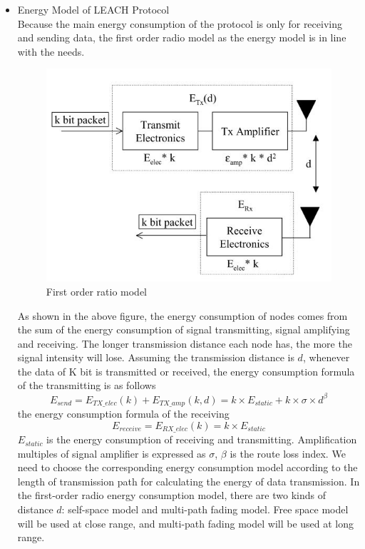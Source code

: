 \documentclass[11pt]{report}
\begin{document}
	\begin{itemize}
		\item Energy Model of LEACH Protocol\\
		
		Because the main energy consumption of the protocol is only for receiving and sending data, the first order radio model as the energy model is in line with the needs.\\
		
		\begin{figure}[h!]
			\centering
			\includegraphics[width=0.6\linewidth]{firstordermodel.jpg}
			\caption{First order ratio model}
			\label{}
		\end{figure}
		As shown in the above figure, the energy consumption of nodes comes  from the sum of the energy consumption of signal transmitting, signal amplifying and receiving. The longer transmission distance each node has, the more the signal intensity will lose. Assuming the transmission distance is $d$, whenever the data of K bit is transmitted or received, the energy consumption formula of the transmitting is as follows\\
		\begin{equation}
		E_{send} = E_{TX\_elec}(k) + E_{TX\_amp}(k,d) = k\times E_{static} + k\times \sigma\times d^\beta
		\end{equation}
		the energy consumption formula of the receiving
		\begin{equation}
		E_{receive} = E_{RX\_elec}(k) = k \times E_{static}
		\end{equation}
		$E_{static}$ is the energy consumption of receiving and transmitting. Amplification multiples of signal amplifier is expressed as $\sigma$, $\beta$ is the route loss index. We need to choose the corresponding energy consumption model according to the length of transmission path for calculating the energy of data transmission. In the first-order radio energy consumption model, there are two kinds of distance $d$: self-space model and multi-path fading model. Free space model will be used at close range, and multi-path fading model will be used at long range. 

\end{itemize}
\end{document}
